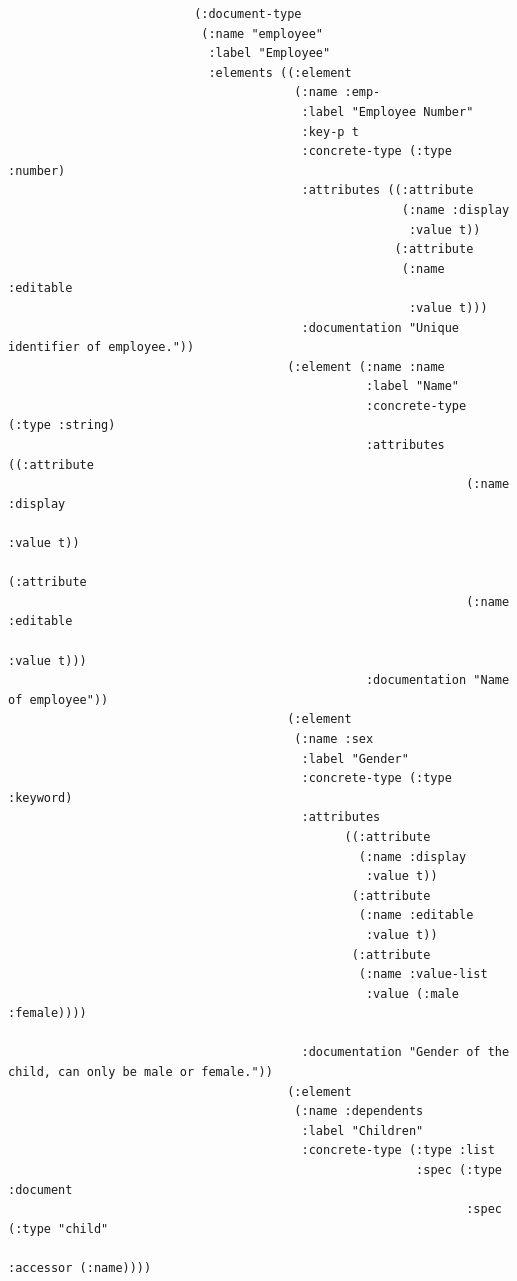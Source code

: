\documentclass[11pt]{article}
\begin{document}
\begin{verbatim}
                          (:document-type
                           (:name "employee"
                            :label "Employee"
                            :elements ((:element
                                        (:name :emp-
                                         :label "Employee Number"
                                         :key-p t
                                         :concrete-type (:type :number)
                                         :attributes ((:attribute
                                                       (:name :display
                                                        :value t))
                                                      (:attribute
                                                       (:name :editable
                                                        :value t)))
                                         :documentation "Unique identifier of employee."))
                                       (:element (:name :name
                                                  :label "Name"
                                                  :concrete-type (:type :string)
                                                  :attributes ((:attribute
                                                                (:name :display
                                                                 :value t))
                                                               (:attribute
                                                                (:name :editable
                                                                 :value t)))
                                                  :documentation "Name of employee"))
                                       (:element
                                        (:name :sex
                                         :label "Gender"
                                         :concrete-type (:type :keyword)
                                         :attributes
                                               ((:attribute
                                                 (:name :display
                                                  :value t))
                                                (:attribute
                                                 (:name :editable
                                                  :value t))
                                                (:attribute
                                                 (:name :value-list
                                                  :value (:male :female))))

                                         :documentation "Gender of the child, can only be male or female."))
                                       (:element
                                        (:name :dependents
                                         :label "Children"
                                         :concrete-type (:type :list
                                                         :spec (:type :document
                                                                :spec (:type "child"
                                                                       :accessor (:name))))


\end{verbatim}
\end{document}
